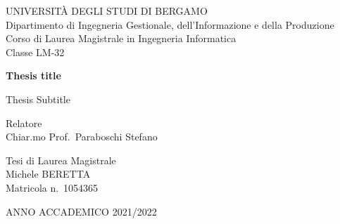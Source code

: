 \begin{titlepage}
  \begin{center}
    \large
    UNIVERSITÀ DEGLI STUDI DI BERGAMO \\
    \vspace{0.5cm}
    \normalsize
    Dipartimento di Ingegneria Gestionale, dell'Informazione e della Produzione \\
    Corso di Laurea Magistrale in Ingegneria Informatica \\
    Classe LM-32

    \vspace*{3cm}

    \Huge
    \textbf{Thesis title}

    \vspace{0.5cm}
    \LARGE
    Thesis Subtitle
  \end{center}

  \vfill

  \begin{flushleft}
    Relatore \\
    Chiar.mo Prof.\ Paraboschi Stefano
  \end{flushleft}

  \vspace{1cm}

  \begin{flushright}
    Tesi di Laurea Magistrale \\
    Michele BERETTA \\
    Matricola n.\ 1054365
  \end{flushright}

  \vfill

  \begin{center}
    ANNO ACCADEMICO 2021/2022
  \end{center}
\end{titlepage}